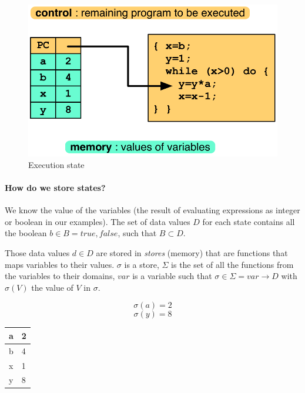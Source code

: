 \documentclass[12pt, a4paper]{book}
\begin{document}
\begin{figure}[!ht]
    \includegraphics[width=\linewidth]{execution_state.png}
    \caption{Execution state}
\end{figure}

\paragraph{How do we store states?} We know the value of the variables (the
result of evaluating expressions as integer or boolean in our examples). The
set of data values $D$ for each state contains all the boolean
$b \in B = {true, false}$, such that $B \subset D$. \newline

Those data values $d \in D$ are stored in \textit{stores} (memory) that are
functions that maps variables to their values. $\sigma$ is a store, $\Sigma$ is
the set of all the functions from the variables to their domains, $var$ is a
variable such that $\sigma \in \Sigma = var \rightarrow D$ with $\sigma(V)$ the
value of $V$ in $\sigma$.

\begin{minipage}{\linewidth}
    \begin{minipage}{0.4\linewidth}
        $$\sigma(a) = 2$$
        $$\sigma(y)=8$$
    \end{minipage}
    \begin{minipage}{0.4\linewidth}
        \centering
        \begin{tabular}{ll}
            \toprule
            a & 2 \\
            \midrule
            b & 4 \\
            \midrule
            x & 1 \\
            \midrule
            y & 8 \\
            \bottomrule
        \end{tabular}
    \end{minipage}
\end{minipage}
\end{document}
